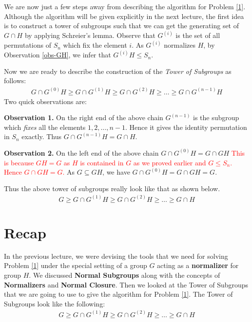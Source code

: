 
We are now just a few steps away from describing the algorithm for Problem \ref{1}. Although the algorithm will be given explicitly in the next lecture, the first idea is to construct a tower of subgroups such that we can get the generating set of $G\cap H$ by applying Schreier's lemma.
Observe that $G^{(i)}$ is the set of all permutations of $S_n$ which fix the element $i$. As $G^{(i)}$ normalizes $H$, by Observation \ref{obs-GH}, we infer that $G^{(i)}H\leq S_n$. 

Now we are ready to describe the construction of the \emph{Tower of Subgroups} as follows:
\begin{eqnarray*}
G\cap G^{(0)}H \geq G\cap G^{(1)}H \geq G\cap G^{(2)}H \geq \ldots \geq G\cap G^{(n-1)}H
\end{eqnarray*}
Two quick observations are:

{\bf Observation 1.} On the right end of the above chain $G^{(n-1)}$ is the subgroup which \emph{fixes} all the elements $1,2,\ldots,n-1$. Hence it gives the identity permutation in $S_n$ exactly. Thus $G\cap G^{(n-1)}H  = G\cap H$.

{\bf Observation 2.} On the left end of the above chain $G\cap G^{(0)}H = G\cap GH$ 
\textcolor{red}{
This is because $GH = G$ as $H$ is contained in $G$ as we proved earlier and $G\leq S_n$. Hence $G\cap GH = G$.}
As $G\subseteq GH$, we have $G\cap G^{(0)}H = G\cap GH = G$.   

Thus the above tower of subgroups really look like that as shown below.
\begin{eqnarray*}
	G\geq G\cap G^{(1)}H \geq G\cap G^{(2)}H \geq \ldots \geq G\cap H
\end{eqnarray*}




\section{Recap}
In the previous lecture, we were devising the tools that we need for solving Problem \ref{1} under the special setting of a group $G$ acting as a {\bf normalizer} for group $H$. We discussed {\bf Normal Subgroups} along with the concepts of {\bf Normalizers} and {\bf Normal Closure}. Then we looked at the Tower of Subgroups that we are going to use to give the algorithm for Problem \ref{1}. The Tower of Subgroups look like the following:
\begin{eqnarray*}
	G\geq G\cap G^{(1)}H \geq G\cap G^{(2)}H \geq \ldots \geq G\cap H
\end{eqnarray*}
